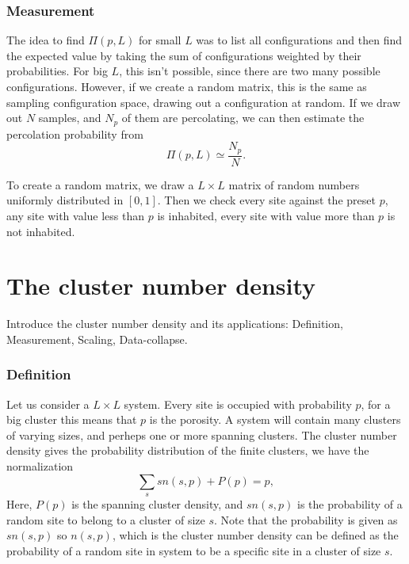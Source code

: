 \documentclass[a4paper, 11pt, notitlepage, english]{article}
\begin{document}
\subsubsection*{Measurement}

The idea to find $\Pi(p, L)$ for small $L$ was to list all configurations and then find the expected value by taking the sum of configurations weighted by their probabilities. For big $L$, this isn't possible, since there are two many possible configurations. However, if we create a random matrix, this is the same as sampling configuration space, drawing out a configuration at random. If we draw out $N$ samples, and $N_p$ of them are percolating, we can then estimate the percolation probability from
$$\Pi(p, L) \simeq \frac{N_p}{N}.$$

To create a random matrix, we draw a $L\times L$ matrix of random numbers uniformly distributed in $[0,1]$. Then we check every site against the preset $p$, any site with value less than $p$ is inhabited, every site with value more than $p$ is not inhabited.
 

\clearpage


\section{The cluster number density}
Introduce the cluster number density and its applications: Definition, Measurement, Scaling, Data-collapse.

\subsubsection*{Definition}

Let us consider a $L\times L$ system. Every site is occupied with probability $p$, for a big cluster this means that $p$ is the porosity. A system will contain many clusters of varying sizes, and perheps one or more spanning clusters. The cluster number density gives the probability distribution of the finite clusters, we have the normalization 
$$\sum_s sn(s,p) + P(p) = p,$$
Here, $P(p)$ is the spanning cluster density, and $sn(s,p)$ is the probability of a random site to belong to a cluster of size $s$. Note that the probability is given as $s n(s,p)$ so $n(s,p)$, which is the cluster number density can be defined as the probability of a random site in system to be a specific site in a cluster of size $s$.
\end{document}
